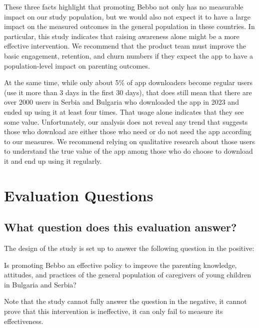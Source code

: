 \documentclass{article}
\begin{document}
These three facts highlight that promoting Bebbo not only has no measurable impact on our study population, but we would also not expect it to have a large impact on the measured outcomes in the general population in these countries. In particular, this study indicates that raising awareness alone might be a more effective intervention. We recommend that the product team must improve the basic engagement, retention, and churn numbers if they expect the app to have a population-level impact on parenting outcomes.

At the same time, while only about 5\% of app downloaders become regular users (use it more than 3 days in the first 30 days), that does still mean that there are over 2000 users in Serbia and Bulgaria who downloaded the app in 2023 and ended up using it at least four times. That usage alone indicates that they see some value. Unfortunately, our analysis does not reveal any trend that suggests those who download are either those who need or do not need the app according to our measures. We recommend relying on qualitative research about those users to understand the true value of the app among those who do choose to download it and end up using it regularly.


\section{Evaluation Questions}

\subsection*{What question does this evaluation answer?}
The design of the study is set up to answer the following question in the positive:

\begin{displayquote}
Is promoting Bebbo an effective policy to improve the parenting knowledge, attitudes, and practices of the general population of caregivers of young children in Bulgaria and Serbia?
\end{displayquote}

\noindent Note that the study cannot fully answer the question in the negative, it cannot prove that this intervention is ineffective, it can only fail to measure its effectiveness.
\end{document}
